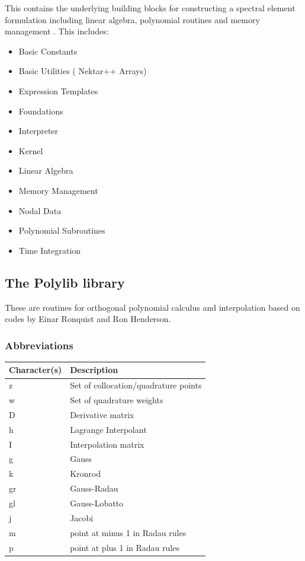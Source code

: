 This contains the underlying building blocks for constructing a spectral element
formulation including linear algebra, polynomial routines and memory management
\cite{Ga39,AbSt64,CaHuYoQu88,GhOs70,KaSh05}. This includes:
\begin{itemize}
\setlength{\itemsep}{0em}
\item Basic Constants
\item Basic Utilities ( Nektar++ Arrays)
\item Expression Templates
\item Foundations
\item Interpreter
\item Kernel
\item Linear Algebra
\item Memory Management
\item Nodal Data
\item Polynomial Subroutines
\item Time Integration
\end{itemize}

\subsection{The Polylib library}
These are routines for orthogonal polynomial calculus and interpolation based on
codes by Einar Ronquist and Ron Henderson.

\subsubsection{Abbreviations}
\begin{tabular}{ll}
\toprule
Character(s) & Description \\
\midrule
z & Set of collocation/quadrature points \\
w & Set of quadrature weights \\
D & Derivative matrix \\
h & Lagrange Interpolant \\
I & Interpolation matrix \\
g & Gauss \\
k & Kronrod \\
gr & Gauss-Radau \\
gl & Gauss-Lobatto \\
j & Jacobi \\
m & point at minus 1 in Radau rules \\
p & point at plus 1 in Radau rules \\
\bottomrule
\end{tabular}



